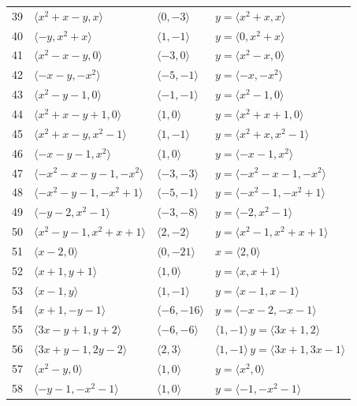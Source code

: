 \documentclass[11pt]{article}
\begin{document}
\begin{longtable}{@{}rlll@{}}
39 & $\langle x^{2}+x-y,x\rangle$ & $\langle 0,-3\rangle$ & $y=\langle x^{2}+x,x\rangle$\\
40 & $\langle -y,x^{2}+x\rangle$ & $\langle 1,-1\rangle$ & $y=\langle 0,x^{2}+x\rangle$\\
41 & $\langle x^{2}-x-y,0\rangle$ & $\langle -3,0\rangle$ & $y=\langle x^{2}-x,0\rangle$\\
42 & $\langle -x-y,-x^{2}\rangle$ & $\langle -5,-1\rangle$ & $y=\langle -x,-x^{2}\rangle$\\
43 & $\langle x^{2}-y-1,0\rangle$ & $\langle -1,-1\rangle$ & $y=\langle x^{2}-1,0\rangle$\\
44 & $\langle x^{2}+x-y+1,0\rangle$ & $\langle 1,0\rangle$ & $y=\langle x^{2}+x+1,0\rangle$\\
45 & $\langle x^{2}+x-y,x^{2}-1\rangle$ & $\langle 1,-1\rangle$ & $y=\langle x^{2}+x,x^{2}-1\rangle$\\
46 & $\langle -x-y-1,x^{2}\rangle$ & $\langle 1,0\rangle$ & $y=\langle -x-1,x^{2}\rangle$\\
47 & $\langle -x^{2}-x-y-1,-x^{2}\rangle$ & $\langle -3,-3\rangle$ & $y=\langle -x^{2}-x-1,-x^{2}\rangle$\\
48 & $\langle -x^{2}-y-1,-x^{2}+1\rangle$ & $\langle -5,-1\rangle$ & $y=\langle -x^{2}-1,-x^{2}+1\rangle$\\
49 & $\langle -y-2,x^{2}-1\rangle$ & $\langle -3,-8\rangle$ & $y=\langle -2,x^{2}-1\rangle$\\
50 & $\langle x^{2}-y-1,x^{2}+x+1\rangle$ & $\langle 2,-2\rangle$ & $y=\langle x^{2}-1,x^{2}+x+1\rangle$\\
51 & $\langle x-2,0\rangle$ & $\langle 0,-21\rangle$ & $x=\langle 2,0\rangle$\\
52 & $\langle x+1,y+1\rangle$ & $\langle 1,0\rangle$ & $y=\langle x,x+1\rangle$\\
53 & $\langle x-1,y\rangle$ & $\langle 1,-1\rangle$ & $y=\langle x-1,x-1\rangle$\\
54 & $\langle x+1,-y-1\rangle$ & $\langle -6,-16\rangle$ & $y=\langle -x-2,-x-1\rangle$\\
55 & $\langle 3x-y+1,y+2\rangle$ & $\langle -6,-6\rangle$ & $\langle 1,-1\rangle\,y=\langle 3x+1,2\rangle$\\
56 & $\langle 3x+y-1,2y-2\rangle$ & $\langle 2,3\rangle$ & $\langle 1,-1\rangle\,y=\langle 3x+1,3x-1\rangle$\\
57 & $\langle x^{2}-y,0\rangle$ & $\langle 1,0\rangle$ & $y=\langle x^{2},0\rangle$\\
58 & $\langle -y-1,-x^{2}-1\rangle$ & $\langle 1,0\rangle$ & $y=\langle -1,-x^{2}-1\rangle$\\

\end{longtable}
\end{document}
